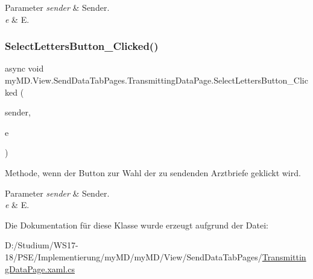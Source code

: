 \begin{DoxyParams}{Parameter}
{\em sender} & Sender.\\
\hline
{\em e} & E.\\
\hline
\end{DoxyParams}
\mbox{\label{classmy_m_d_1_1_view_1_1_send_data_tab_pages_1_1_transmitting_data_page_abe7d80460f8b561dfecadfd4fbdd849f}} 
\subsubsection{\texorpdfstring{Select\+Letters\+Button\+\_\+\+Clicked()}{SelectLettersButton\_Clicked()}}
{\footnotesize\ttfamily async void my\+M\+D.\+View.\+Send\+Data\+Tab\+Pages.\+Transmitting\+Data\+Page.\+Select\+Letters\+Button\+\_\+\+Clicked (\begin{DoxyParamCaption}\item[{object}]{sender,  }\item[{Event\+Args}]{e }\end{DoxyParamCaption})}



Methode, wenn der Button zur Wahl der zu sendenden Arztbriefe geklickt wird. 


\begin{DoxyParams}{Parameter}
{\em sender} & Sender.\\
\hline
{\em e} & E.\\
\hline
\end{DoxyParams}


Die Dokumentation für diese Klasse wurde erzeugt aufgrund der Datei\+:\begin{DoxyCompactItemize}
\item 
D\+:/\+Studium/\+W\+S17-\/18/\+P\+S\+E/\+Implementierung/my\+M\+D/my\+M\+D/\+View/\+Send\+Data\+Tab\+Pages/\mbox{\hyperlink{_transmitting_data_page_8xaml_8cs}{Transmitting\+Data\+Page.\+xaml.\+cs}}\end{DoxyCompactItemize}
